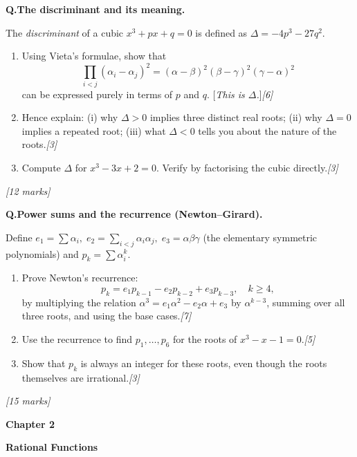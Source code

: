 \documentclass[12pt,a4paper]{article}
\theoremstyle{defstyle}
\newcounter{qnum}
\newcommand{\Q}[1]{\stepcounter{qnum}\medskip\noindent\textbf{Q\theqnum.}\quad #1\par}
\newcommand{\mks}[1]{\hfill\textit{[#1 marks]}}
\newcommand{\chapterbanner}[2]{%
  \clearpage
  \begin{tcolorbox}[colback=chaptercol!10, colframe=chaptercol,
      left=10pt, right=10pt, top=8pt, bottom=8pt]
    {\large\bfseries\color{chaptercol} Chapter #1}\par\vspace{2pt}
    {\LARGE\bfseries #2}
  \end{tcolorbox}
  \vspace{6pt}
}
\begin{document}
\vspace{8pt}

\begin{tcolorbox}[explore, title={\color{explorecol}\bfseries Exploration (Beyond Syllabus)}]

\Q{\textbf{The discriminant and its meaning.}

The \emph{discriminant} of a cubic \(x^3+px+q=0\) is defined as \(\Delta = -4p^3-27q^2\).

\begin{enumerate}[label=(\alph*),itemsep=4pt]
  \item Using Vieta's formulae, show that
  \[
    \prod_{i<j}(\alpha_i-\alpha_j)^2
    = (\alpha-\beta)^2(\beta-\gamma)^2(\gamma-\alpha)^2
  \]
  can be expressed purely in terms of \(p\) and \(q\).  [\textit{This is \(\Delta\).}]\hfill\textit{[6]}
  \item Hence explain: (i) why \(\Delta>0\) implies three distinct real roots; (ii) why \(\Delta=0\) implies a repeated root; (iii) what \(\Delta<0\) tells you about the nature of the roots.\hfill\textit{[3]}
  \item Compute \(\Delta\) for \(x^3-3x+2=0\).  Verify by factorising the cubic directly.\hfill\textit{[3]}
\end{enumerate}\mks{12}}

\Q{\textbf{Power sums and the recurrence (Newton--Girard).}

Define \(e_1=\sum\alpha_i,\;e_2=\sum_{i<j}\alpha_i\alpha_j,\;e_3=\alpha\beta\gamma\) (the elementary symmetric polynomials) and \(p_k=\sum\alpha_i^k\).

\begin{enumerate}[label=(\alph*),itemsep=4pt]
  \item Prove Newton's recurrence:
  \[p_k = e_1 p_{k-1} - e_2 p_{k-2} + e_3 p_{k-3},\quad k\geq 4,\]
  by multiplying the relation \(\alpha^3=e_1\alpha^2-e_2\alpha+e_3\) by \(\alpha^{k-3}\), summing over all three roots, and using the base cases.\hfill\textit{[7]}
  \item Use the recurrence to find \(p_1,\ldots,p_6\) for the roots of \(x^3-x-1=0\).\hfill\textit{[5]}
  \item Show that \(p_k\) is always an integer for these roots, even though the roots themselves are irrational.\hfill\textit{[3]}
\end{enumerate}\mks{15}}

\end{tcolorbox}

\chapterbanner{2}{Rational Functions}
\end{document}
